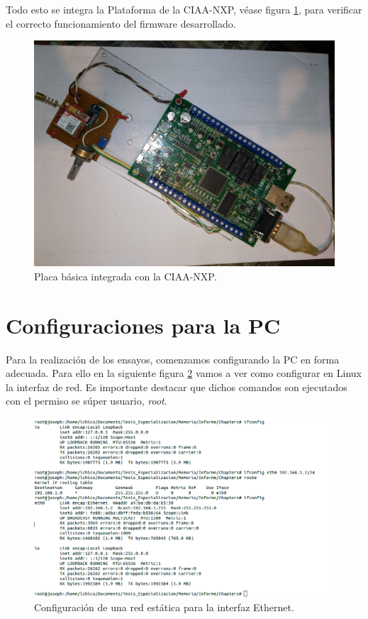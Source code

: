 Todo esto se integra la Plataforma de la CIAA-NXP, véase figura \ref{fig:prototipo}, para verificar el correcto funcionamiento del firmware desarrollado.

\begin{figure}[h]
  \centering
  \includegraphics[scale=.04]{./Figures/prototipo.jpg}
  \caption{Placa básica integrada con la CIAA-NXP.}
  \label{fig:prototipo}
\end{figure}

\section{Configuraciones para la PC}

Para la realización de los ensayos, comenzamos configurando la PC en forma adecuada. Para ello en la siguiente figura \ref{fig:hw_pc} vamos a ver como configurar en Linux la interfaz de red. Es importante destacar que dichos comandos son ejecutados con el permiso se súper usuario, \emph{root}.

\begin{figure}[h]
  \centering
  \includegraphics[scale=.35]{./Figures/config_net_console.png}
  \caption{Configuración de una red estática para la interfaz Ethernet.}
  \label{fig:hw_pc}
\end{figure}


